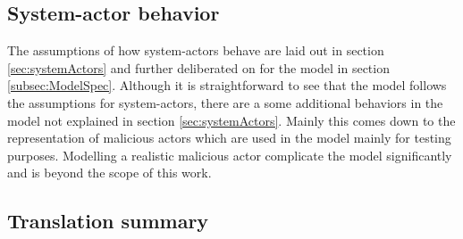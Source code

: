 \subsection{System-actor behavior}
\label{subsec:DiscussionBehaviourAssumptions}

The assumptions of how system-actors behave are laid out in section \ref{sec:systemActors} and further deliberated on for the model in section \ref{subsec:ModelSpec}. Although it is straightforward to see that the model follows the assumptions for system-actors, there are a some additional behaviors in the model not explained in section \ref{sec:systemActors}. Mainly this comes down to the representation of malicious actors which are used in the model mainly for testing purposes. Modelling a realistic malicious actor complicate the model significantly and is beyond the scope of this work.


\subsection{Translation summary}